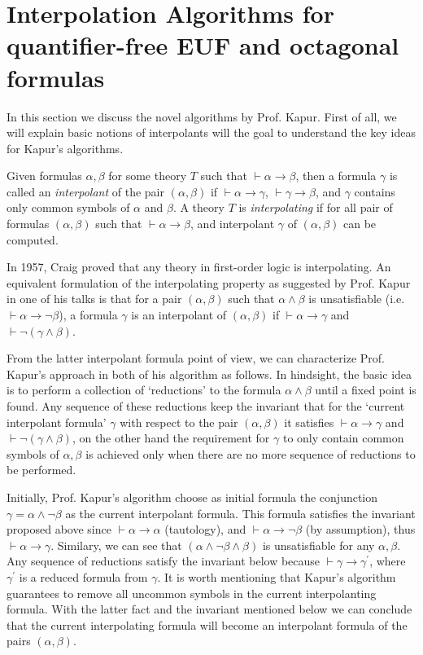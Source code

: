 \section{Interpolation Algorithms for quantifier-free EUF and octagonal formulas}

In this section we discuss the novel algorithms by Prof. Kapur. First of all,
we will explain basic notions of interpolants will the goal to understand
the key ideas for Kapur's algorithms.

 Given formulas $\alpha, \beta$ for some theory $T$ such that
$\vdash \alpha \rightarrow \beta$, then a formula $\gamma$ is called
an \textit{interpolant} of the pair $(\alpha, \beta)$ if
$\vdash \alpha \rightarrow \gamma$, $\vdash \gamma \rightarrow \beta$,
and $\gamma$ contains only common symbols of $\alpha$ and $\beta$. A theory
$T$ is \textit{interpolating} if for all pair of formulas $(\alpha, \beta)$
such that $\vdash \alpha \rightarrow \beta$, and interpolant $\gamma$ of
$(\alpha, \beta)$ can be computed.

In 1957, Craig \cite{craig1957} proved that any theory in first-order logic
is interpolating. An equivalent formulation of the interpolating
property as suggested by Prof. Kapur in one of his talks is that for a
pair $(\alpha, \beta)$ such that $\alpha \land \beta$ is unsatisfiable
(i.e. $\vdash \alpha \rightarrow \neg \beta$),
a formula $\gamma$ is an interpolant of $(\alpha, \beta)$ if
$\vdash \alpha \rightarrow \gamma$ and $\vdash \neg (\gamma \land \beta)$.

From the latter interpolant formula point of view, we can characterize
Prof. Kapur's approach in both of his algorithm as follows. In hindsight, the basic
idea is to perform a collection of `reductions' to the formula $\alpha \land \beta$
until a fixed point is found. Any sequence of these reductions keep the
invariant that for the `current interpolant formula' $\gamma$ with respect
to the pair $(\alpha, \beta)$ it satisfies $\vdash \alpha \rightarrow \gamma$ and
$\vdash \neg(\gamma \land \beta)$, on the other hand the requirement for
$\gamma$ to only contain common symbols of $\alpha, \beta$ is achieved only
when there are no more sequence of reductions to be performed.

Initially, Prof. Kapur's algorithm choose as initial formula the conjunction
$\gamma = \alpha \land \neg\beta$ as the current interpolant formula. This formula satisfies
the invariant proposed above since $\vdash \alpha \rightarrow \alpha$ (tautology),
and $\vdash \alpha \rightarrow \neg\beta$ (by assumption), thus $\vdash \alpha \rightarrow \gamma$.
Similary, we can see that $(\alpha \land \neg \beta \land \beta)$ is unsatisfiable for any $\alpha, \beta$.
Any sequence of reductions satisfy the invariant below because
$\vdash \gamma \rightarrow \gamma^{'}$, where $\gamma^{'}$ is a reduced formula from $\gamma$.
It is worth mentioning that Kapur's algorithm guarantees to remove all uncommon symbols
in the current interpolanting formula. With the latter fact and the invariant
mentioned below we can conclude that the current interpolating formula will
become an interpolant formula of the pairs $(\alpha, \beta)$.


